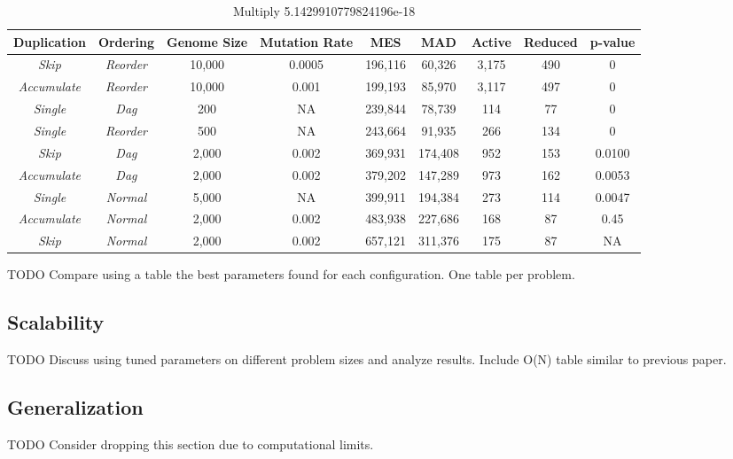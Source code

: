 \documentclass[journal]{IEEEtran}
\begin{document}
\begin{table*}
	\centering
	\begin{tabular}{|c|c|c|c|c|c|c|c|c|}
	  \hline
\textbf{Duplication} & \textbf{Ordering} & \textbf{Genome Size} & \textbf{Mutation Rate} & \textbf{MES} & \textbf{MAD} & \textbf{Active} & \textbf{Reduced} & \textbf{p-value} \\ \hline
\emph{Skip} & \emph{Reorder}      & 10,000 & 0.0005  & 196,116  & 60,326  & 3,175 & 490 & 0  \\ \hline
\emph{Accumulate} & \emph{Reorder}& 10,000 & 0.001 & 199,193 & 85,970 & 3,117 & 497 & 0  \\ \hline
\emph{Single} & \emph{Dag} & 200  & NA & 239,844 & 78,739 & 114 & 77 & 0 \\ \hline
\emph{Single} & \emph{Reorder}    & 500   & NA & 243,664 & 91,935 & 266 & 134 & 0 \\ \hline
\emph{Skip} & \emph{Dag}          & 2,000 & 0.002 & 369,931 & 174,408 & 952 & 153 & 0.0100 \\ \hline
\emph{Accumulate} & \emph{Dag}    & 2,000 & 0.002  & 379,202 & 147,289 & 973 & 162 & 0.0053  \\ \hline
\emph{Single} & \emph{Normal}     & 5,000  & NA & 399,911 & 194,384 & 273 & 114 & 0.0047 \\ \hline
\emph{Accumulate} & \emph{Normal} & 2,000 & 0.002 & 483,938 & 227,686 & 168 & 87 & 0.45 \\ \hline
\rowcolor{Gray}
\emph{Skip} & \emph{Normal} & 2,000 & 0.002 & 657,121 & 311,376 & 175 & 87 & NA \\ \hline

	\end{tabular}
	\caption{Multiply 5.1429910779824196e-18}
	\label{tab:Multiply}
\end{table*}


TODO Compare using a table the best parameters found for each configuration.
One table per problem.


\subsection{Scalability}
TODO Discuss using tuned parameters on different problem sizes and analyze
results.  Include O(N) table similar to previous paper.

\subsection{Generalization}
TODO Consider dropping this section due to computational limits. 
\end{document}
